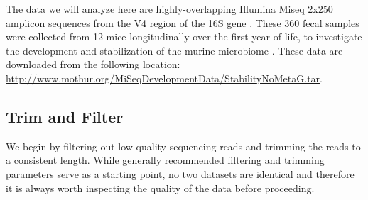 The data we will analyze here are highly-overlapping Illumina Miseq
2x250 amplicon sequences from the V4 region of the 16S gene \cite{Kozich2013}.
These 360 fecal samples were collected from 12 mice longitudinally over the
first year of life, to investigate the development and
stabilization of the murine microbiome \cite{schloss2012stabilization}.
These data are downloaded from the following location:
\url{http://www.mothur.org/MiSeqDevelopmentData/StabilityNoMetaG.tar}.

\begin{knitrout}
\color{fgcolor}\begin{kframe}
\begin{alltt}
 \hlkwb{<-} \hlstd{(}\hlstd{,} \hlstd{)}
 \hlkwb{<-} \hlstd{(}\hlstd{,} \hlstd{)}

\hlstd{(}\hlopt{!}\hlstd{(}
  \hlstd{(}\hlstd{,}
                \hlstd{=}  \hlstd{))}
  \hlstd{(}\hlstd{(}\hlstd{,}  \hlstd{),}
                \hlstd{))}
\hlstd{\}}

 \hlkwb{<-} \hlstd{(}  \hlstd{=} \hlstd{))}
 \hlkwb{<-} \hlstd{fns[}\hlstd{(}\hlstd{, fns)]}
 \hlkwb{<-} \hlstd{fns[}\hlstd{(}\hlstd{, fns)]}
\end{alltt}
\end{kframe}
\end{knitrout}

\subsection*{Trim and Filter}

We begin by filtering out low-quality sequencing reads and trimming the
reads to a consistent length. While generally recommended filtering and
trimming parameters serve as a starting point, no two datasets are
identical and therefore it is always worth inspecting the quality of the
data before proceeding.

